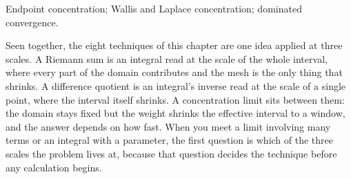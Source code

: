 \begin{seealsob}Endpoint concentration; Wallis and Laplace concentration; dominated convergence.\end{seealsob}

Seen together, the eight techniques of this chapter are one idea applied at three scales. A Riemann sum is an integral read at the scale of the whole interval, where every part of the domain contributes and the mesh is the only thing that shrinks. A difference quotient is an integral's inverse read at the scale of a single point, where the interval itself shrinks. A concentration limit sits between them: the domain stays fixed but the weight shrinks the effective interval to a window, and the answer depends on how fast. When you meet a limit involving many terms or an integral with a parameter, the first question is which of the three scales the problem lives at, because that question decides the technique before any calculation begins.

